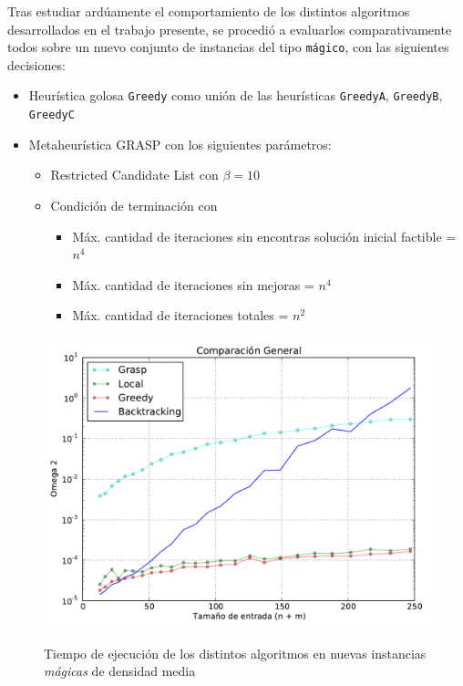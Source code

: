 Tras estudiar ardúamente el comportamiento de los distintos algoritmos desarrollados en el trabajo presente, se procedió a evaluarlos comparativamente todos sobre un nuevo conjunto de instancias del tipo \texttt{mágico}, con las siguientes decisiones:
\begin{itemize}
    \item Heurística golosa \texttt{Greedy} como unión de las heurísticas \texttt{GreedyA}, \texttt{GreedyB}, \texttt{GreedyC} 
    \item Metaheurística GRASP con los siguientes parámetros:
        \begin{itemize}
            \item Restricted Candidate List con $\beta = 10$
            \item Condición de terminación con 
            \begin{itemize}
                \item Máx. cantidad de iteraciones sin encontras solución inicial factible = $n^4$
                \item Máx. cantidad de iteraciones sin mejoras = $n^4$
                \item Máx. cantidad de iteraciones totales = $n^2$
            \end{itemize}
        \end{itemize}
\end{itemize}

\begin{figure}[H]
\begin{center}
\includegraphics[angle=0, scale=.75]{imagenes/todas-tiempo.pdf}
\label{grafico local tiempo}
\caption{Tiempo de ejecución de los distintos algoritmos en nuevas instancias \textit{mágicas} de densidad media}
\end{center}
\end{figure}

